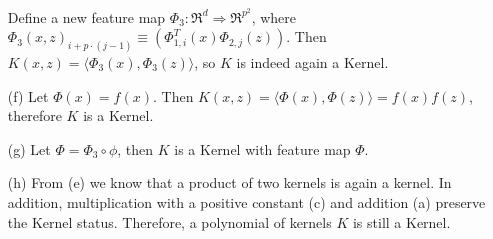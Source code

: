 \begin{answer}
\begin{enumerate}
\begin{align*}
     \end{align*}
     Define a new feature map $\Phi_3: \Re^d \Rightarrow \Re^{p^2}$, where $\Phi_3(x,z)_{i +p\cdot (j-1)}\equiv (\Phi_{1,i}^T(x) \Phi_{2,j}(z))$.
     Then $K(x,z) = \langle\Phi_{3}(x), \Phi_{3}(z)\rangle$, so $K$ is indeed again a Kernel.
     \item[(f)] Let $\Phi(x) = f(x)$. 
     Then $K(x,z) = \langle\Phi(x), \Phi(z)\rangle =  f(x)f(z)$, therefore $K$ is a Kernel.
     \item[(g)] Let $\Phi = \Phi_3 \circ \phi$, then $K$ is a Kernel with feature map $\Phi$.
     \item[(h)] From (e) we know that a product of two kernels is again a kernel.
      In addition, multiplication with a positive constant (c) and 
     addition (a) preserve the Kernel status. Therefore,  a polynomial of kernels $K$ is still a Kernel.

\end{enumerate}
\end{answer}
